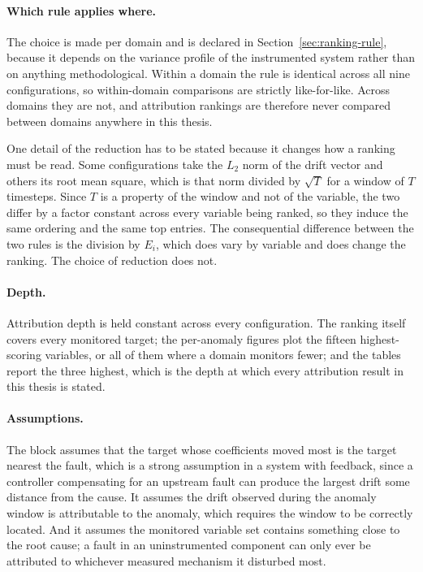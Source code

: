 \paragraph{Which rule applies where.} The choice is made per domain and is declared in Section~\ref{sec:ranking-rule}, because it depends on the variance profile of the instrumented system rather than on anything methodological. Within a domain the rule is identical across all nine configurations, so within-domain comparisons are strictly like-for-like. Across domains they are not, and attribution rankings are therefore never compared between domains anywhere in this thesis.

One detail of the reduction has to be stated because it changes how a ranking must be read. Some configurations take the $L_2$ norm of the drift vector and others its root mean square, which is that norm divided by $\sqrt{T}$ for a window of $T$ timesteps. Since $T$ is a property of the window and not of the variable, the two differ by a factor constant across every variable being ranked, so they induce the same ordering and the same top entries. The consequential difference between the two rules is the division by $E_i$, which does vary by variable and does change the ranking. The choice of reduction does not.

\paragraph{Depth.} Attribution depth is held constant across every configuration. The ranking itself covers every monitored target; the per-anomaly figures plot the fifteen highest-scoring variables, or all of them where a domain monitors fewer; and the tables report the three highest, which is the depth at which every attribution result in this thesis is stated.

\paragraph{Assumptions.} The block assumes that the target whose coefficients moved most is the target nearest the fault, which is a strong assumption in a system with feedback, since a controller compensating for an upstream fault can produce the largest drift some distance from the cause. It assumes the drift observed during the anomaly window is attributable to the anomaly, which requires the window to be correctly located. And it assumes the monitored variable set contains something close to the root cause; a fault in an uninstrumented component can only ever be attributed to whichever measured mechanism it disturbed most.
